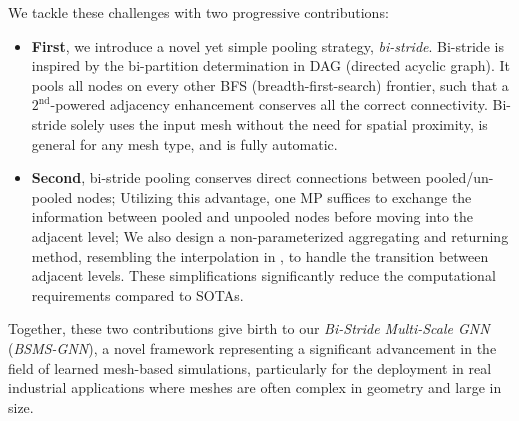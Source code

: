 We tackle these challenges with two progressive contributions:
\begin{itemize}
    \item \textbf{First}, we introduce a novel yet simple pooling strategy, \textit{bi-stride}. Bi-stride is inspired by the bi-partition determination in DAG (directed acyclic graph). It pools all nodes on every other BFS (breadth-first-search) frontier, such that a $2^{\text{nd}}$-powered adjacency enhancement  conserves all the correct connectivity. Bi-stride solely uses the input mesh without the need for spatial proximity, is general for any mesh type, and is fully automatic.
    \item \textbf{Second}, bi-stride pooling conserves direct connections between pooled/un-pooled nodes; Utilizing this advantage, one MP suffices to exchange the information between pooled and unpooled nodes before moving into the adjacent level; We also design a non-parameterized aggregating and returning method, resembling the interpolation in , to handle the transition between adjacent levels. These simplifications significantly reduce the computational requirements compared to SOTAs.
\end{itemize}
Together, these two contributions give birth to our \textit{Bi-Stride Multi-Scale GNN} (\textit{BSMS-GNN}), a novel framework representing a significant advancement in the field of learned mesh-based simulations, particularly for the deployment in real industrial applications where meshes are often complex in geometry and large in size.
